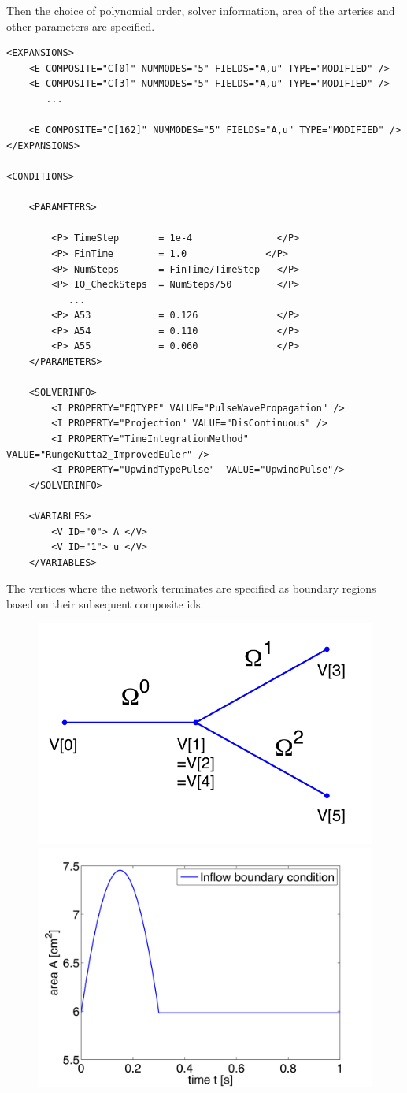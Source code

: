 Then the choice of polynomial order, solver information, area of the arteries
and other parameters are specified.

\begin{lstlisting}[style=XmlStyle]
<EXPANSIONS>
    <E COMPOSITE="C[0]" NUMMODES="5" FIELDS="A,u" TYPE="MODIFIED" />
    <E COMPOSITE="C[3]" NUMMODES="5" FIELDS="A,u" TYPE="MODIFIED" />
       ...

    <E COMPOSITE="C[162]" NUMMODES="5" FIELDS="A,u" TYPE="MODIFIED" />
</EXPANSIONS>

<CONDITIONS>

    <PARAMETERS>

        <P> TimeStep       = 1e-4               </P> 
        <P> FinTime        = 1.0              </P>
        <P> NumSteps       = FinTime/TimeStep   </P>
        <P> IO_CheckSteps  = NumSteps/50        </P>
           ...
        <P> A53            = 0.126              </P>
        <P> A54            = 0.110              </P>
        <P> A55            = 0.060              </P>
    </PARAMETERS>

    <SOLVERINFO>
        <I PROPERTY="EQTYPE" VALUE="PulseWavePropagation" />
        <I PROPERTY="Projection" VALUE="DisContinuous" />
        <I PROPERTY="TimeIntegrationMethod" VALUE="RungeKutta2_ImprovedEuler" />
        <I PROPERTY="UpwindTypePulse"  VALUE="UpwindPulse"/> 
    </SOLVERINFO>

    <VARIABLES>
        <V ID="0"> A </V>
        <V ID="1"> u </V>
    </VARIABLES>

\end{lstlisting}

The vertices where the network terminates are specified as boundary regions
based on their subsequent composite ids.

\begin{figure}
	\includegraphics[width=0.49\linewidth]{Figures/Bifurcation.png}
	\includegraphics[width=0.49\linewidth]{Figures/Network_Inflow.png}
\end{figure}

